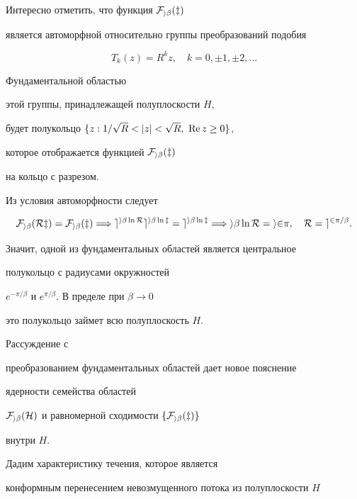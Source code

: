 \begin{notenonum} 


Интересно отметить, что функция $\cal F_{i\beta}(z)$ 


является автоморфной относительно группы преобразований подобия 


$$ 


T_k(z)=R^k z,\quad k=0,\pm1,\pm2,\dotsc 


$$ 


Фундаментальной областью 


этой группы, принадлежащей полуплоскости $H$, 


будет полукольцо $\{z:1/\sqrt{R}<|z|<\sqrt{R},\ \re z\ge 0\}$, 


которое отображается функцией $\cal F_{i\beta}(z)$ 


на кольцо с разрезом. 


Из условия автоморфности следует 


$$ 


\cal F_{i\beta}(R z)=\cal F_{i\beta}(z)\Longrightarrow 


e^{i\beta\ln R}e^{i\beta\ln z}=e^{i\beta\ln z}\Longrightarrow 


i\beta\ln R=i2\pi,\quad R=e^{2\pi/\beta}. 


$$ 


Значит, одной из фундаментальных областей является центральное 


полукольцо с радиусами окружностей 


$e^{-\pi/\beta}$ и $e^{\pi/\beta}$. В пределе при $\beta\to 0$ 


это полукольцо займет всю полуплоскость $H$.





Рассуждение с 


преобразованием фундаментальных областей дает новое пояснение 


ядерности семейства областей 


$\cal F_{i\beta}(H)$ и равномерной сходимости $\{\cal F_{i\beta}(z)\}$ 


внутри $H$. 


\end{notenonum} 


 


Дадим характеристику течения, которое является 


конформным перенесением невозмущенного потока из полуплоскости $H$ 


